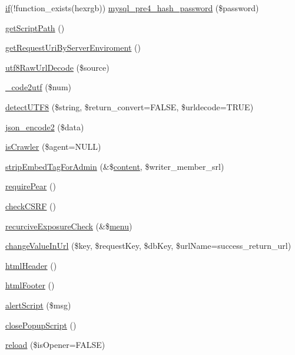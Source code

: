 \begin{DoxyCompactItemize}
\hyperlink{config_8inc_8php_a73b98c0274e28635a594091f9ca43cb4}{if}(!function\+\_\+exists(\textquotesingle{}hexrgb\textquotesingle{})) \hyperlink{func_8inc_8php_a82aee1d4b0bcbdb52d5a723b1a0fa777}{mysql\+\_\+pre4\+\_\+hash\+\_\+password} (\$password)
\item 
\hyperlink{func_8inc_8php_a1086859329d03f8830d51d254c18e47e}{get\+Script\+Path} ()
\item 
\hyperlink{func_8inc_8php_a372c0e65e6e4778fc4e97b1fc3775463}{get\+Request\+Uri\+By\+Server\+Enviroment} ()
\item 
\hyperlink{func_8inc_8php_af1649820887f052ce1f1c9ca623f2db3}{utf8\+Raw\+Url\+Decode} (\$source)
\item 
\hyperlink{func_8inc_8php_a07446b33f4eda53315b12fc1c1b15f5a}{\+\_\+code2utf} (\$num)
\item 
\hyperlink{func_8inc_8php_a97f60adff3c4bbb5a341a557eef742b0}{detect\+U\+T\+F8} (\$string, \$return\+\_\+convert=F\+A\+L\+SE, \$urldecode=T\+R\+UE)
\item 
\hyperlink{func_8inc_8php_a3c49ddc63881e57fc5dd1aa4f923ef0c}{json\+\_\+encode2} (\$data)
\item 
\hyperlink{func_8inc_8php_a490ffbd4821da1995c76c381553d5b3d}{is\+Crawler} (\$agent=N\+U\+LL)
\item 
\hyperlink{func_8inc_8php_ad6d8ff5f851d62d39b170a46b766d834}{strip\+Embed\+Tag\+For\+Admin} (\&\$\hyperlink{classcontent}{content}, \$writer\+\_\+member\+\_\+srl)
\item 
\hyperlink{func_8inc_8php_ad09c8e07e96c499b4b71d54c2950e704}{require\+Pear} ()
\item 
\hyperlink{func_8inc_8php_a887fd7fe841f5dac3179296ae770172a}{check\+C\+S\+RF} ()
\item 
\hyperlink{func_8inc_8php_a229b3ea7ca966e907d266bc60efa353b}{recurcive\+Exposure\+Check} (\&\$\hyperlink{classmenu}{menu})
\item 
\hyperlink{func_8inc_8php_a803ae4f2d5437f4bad33bf4b5d20c627}{change\+Value\+In\+Url} (\$key, \$request\+Key, \$db\+Key, \$url\+Name=\textquotesingle{}success\+\_\+return\+\_\+url\textquotesingle{})
\item 
\hyperlink{func_8inc_8php_adf603cdce37b515631c58bb3acffa614}{html\+Header} ()
\item 
\hyperlink{func_8inc_8php_a2f21eda8628bd378f56529cb680006b0}{html\+Footer} ()
\item 
\hyperlink{func_8inc_8php_acc16be2ad7371ac6478f2314f1248fe2}{alert\+Script} (\$msg)
\item 
\hyperlink{func_8inc_8php_a11562ea030a5d83564d0fbfcfabc8af9}{close\+Popup\+Script} ()
\item 
\hyperlink{func_8inc_8php_aaf78eccbde1406d602a7c408a364be24}{reload} (\$is\+Opener=F\+A\+L\+SE)
\end{DoxyCompactItemize}
